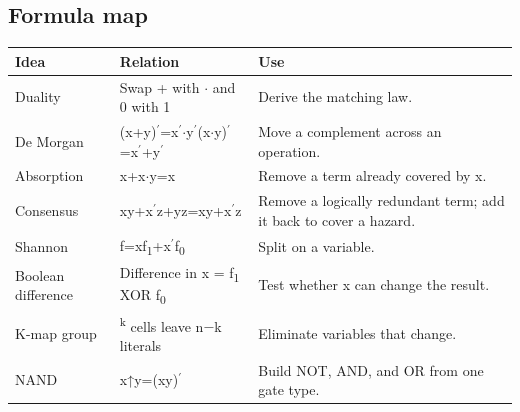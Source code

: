 \documentclass[11pt]{article}
\begin{document}
\begin{keepsection}
\section{Formula map}

\begin{center}\small\begin{tabularx}{\linewidth}{>{\raggedright\arraybackslash}X>{\raggedright\arraybackslash}X>{\raggedright\arraybackslash}X}\toprule
\textbf{Idea} & \textbf{Relation} & \textbf{Use} \\ \midrule
Duality & Swap + with \ensuremath{\cdot} and 0 with 1 & Derive the matching law. \\
De Morgan & (x+y)\ensuremath{{}^{\prime}}=x\ensuremath{{}^{\prime}}\ensuremath{\cdot}y\ensuremath{{}^{\prime}}(x\ensuremath{\cdot}y)\ensuremath{{}^{\prime}}=x\ensuremath{{}^{\prime}}+y\ensuremath{{}^{\prime}} & Move a complement across an operation. \\
Absorption & x+x\ensuremath{\cdot}y=x & Remove a term already covered by x. \\
Consensus & xy+x\ensuremath{{}^{\prime}}z+yz=xy+x\ensuremath{{}^{\prime}}z & Remove a logically redundant term; add it back to cover a hazard. \\
Shannon & f=xf\textsubscript{1}+x\ensuremath{{}^{\prime}}f\textsubscript{0} & Split on a variable. \\
Boolean difference & Difference in x = f\textsubscript{1} XOR f\textsubscript{0} & Test whether x can change the result. \\
K-map group & 2\textsuperscript{k} cells leave n\ensuremath{-}k literals & Eliminate variables that change. \\
NAND & x↑y=(xy)\ensuremath{{}^{\prime}} & Build NOT, AND, and OR from one gate type. \\
\bottomrule\end{tabularx}\end{center}
\end{keepsection}
\end{document}
